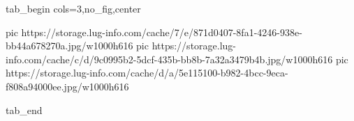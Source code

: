  
 
 
 
 


\ifcmt
  tab_begin cols=3,no_fig,center

     pic https://storage.lug-info.com/cache/7/e/871d0407-8fa1-4246-938e-bb44a678270a.jpg/w1000h616%
		 pic https://storage.lug-info.com/cache/c/d/9c0995b2-5dcf-435b-bb8b-7a32a3479b4b.jpg/w1000h616%
		 pic https://storage.lug-info.com/cache/d/a/5e115100-b982-4bcc-9eca-f808a94000ee.jpg/w1000h616%

  tab_end
\fi
